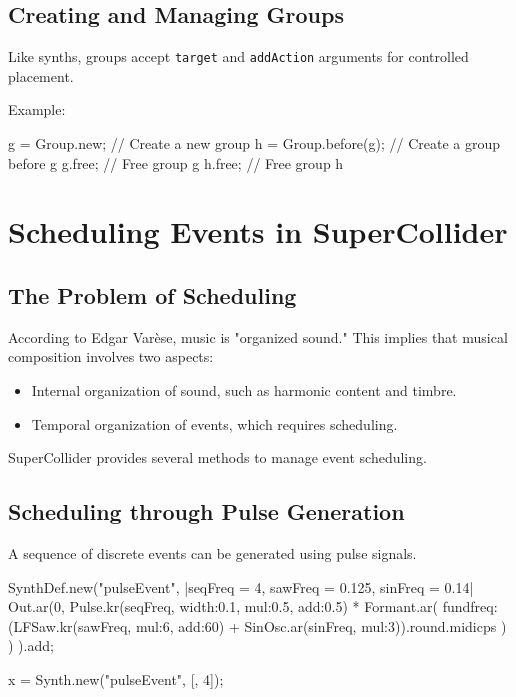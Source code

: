 \subsection{Creating and Managing Groups}

Like synths, groups accept \texttt{target} and \texttt{addAction} arguments for controlled placement.

Example:

\begin{supercollider*}
g = Group.new;        // Create a new group
h = Group.before(g);  // Create a group before g
g.free;              // Free group g
h.free;              // Free group h
\end{supercollider*}

\section{Scheduling Events in SuperCollider}

\subsection{The Problem of Scheduling}

According to Edgar Varèse, music is "organized sound." This implies that musical composition involves two aspects:

\begin{itemize}
    \item Internal organization of sound, such as harmonic content and timbre.
    \item Temporal organization of events, which requires scheduling.
\end{itemize}

SuperCollider provides several methods to manage event scheduling.

\subsection{Scheduling through Pulse Generation}

A sequence of discrete events can be generated using pulse signals.

\begin{supercollider*}
SynthDef.new("pulseEvent", { |seqFreq = 4, sawFreq = 0.125, sinFreq = 0.14| 
    Out.ar(0,
        Pulse.kr(seqFreq, width:0.1, mul:0.5, add:0.5) *
        Formant.ar(
            fundfreq: (LFSaw.kr(sawFreq, mul:6, add:60) + SinOsc.ar(sinFreq, mul:3)).round.midicps
        )
    )
}).add; 

x = Synth.new("pulseEvent", [\seqFreq , 4]);
\end{supercollider*}

